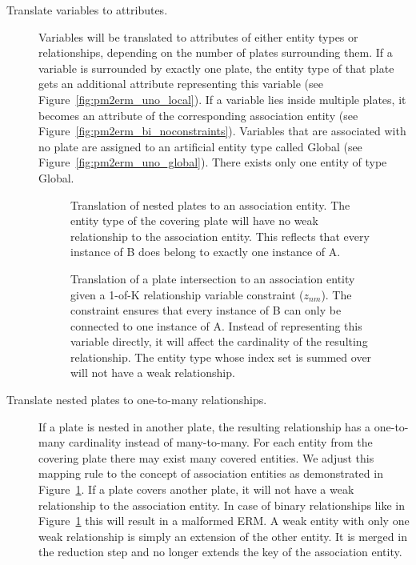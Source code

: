 \begin{description}
\item[Translate variables to attributes.] Variables will be translated to attributes of either entity types or relationships, depending on the number of plates surrounding them. If a variable is surrounded by exactly one plate, the entity type of that plate gets an additional attribute representing this variable (see Figure~\ref{fig:pm2erm_uno_local}). If a variable lies inside multiple plates, it becomes an attribute of the corresponding association entity (see Figure~\ref{fig:pm2erm_bi_noconstraints}). Variables that are associated with no plate are assigned to an artificial entity type called Global (see Figure~\ref{fig:pm2erm_uno_global}). There exists only one entity of type Global.

\begin{figure}[h!]
\centering
\scalebox{\tikzScale}{\adjustTikzSize }
\caption[Translation of nested plates to an ERM]{Translation of nested plates to an association entity. The entity type of the covering plate will have no weak relationship to the association entity. This reflects that every instance of B does belong to exactly one instance of A.}\label{fig:pm2erm_covered_1}
\end{figure}

\begin{figure}[h!]
\centering
\scalebox{\tikzScale}{\adjustTikzSize }
\caption[Translation of plate intersections with 1-of-K variables to an ERM]{Translation of a plate intersection to an association entity given a 1-of-K relationship variable constraint ($z_{nm}$). The constraint ensures that every instance of B can only be connected to one instance of A. Instead of representing this variable directly, it will affect the cardinality of the resulting relationship. The entity type whose index set is summed over will not have a weak relationship.}\label{fig:pm2erm_bi_constraints}
\end{figure}

\item[Translate nested plates to one-to-many relationships.] If a plate is nested in another plate, the resulting relationship has a one-to-many cardinality instead of many-to-many. For each entity from the covering plate there may exist many covered entities. We adjust this mapping rule to the concept of association entities as demonstrated in Figure~\ref{fig:pm2erm_covered_1}. If a plate covers another plate, it will not have a weak relationship to the association entity. In case of binary relationships like in Figure~\ref{fig:pm2erm_covered_1} this will result in a malformed ERM. A weak entity with only one weak relationship is simply an extension of the other entity. It is merged in the reduction step and no longer extends the key of the association entity.
\end{description}

